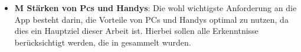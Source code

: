 \begin{itemize}
	\item \textbf{M Stärken von Pcs und Handys}: %
		Die wohl wichtigste Anforderung an die App besteht darin, die Vorteile von PCs und Handys optimal zu nutzen, da dies ein Hauptziel dieser Arbeit ist. Hierbei sollen alle Erkenntnisse berücksichtigt werden, die in  gesammelt wurden.



\end{itemize}
